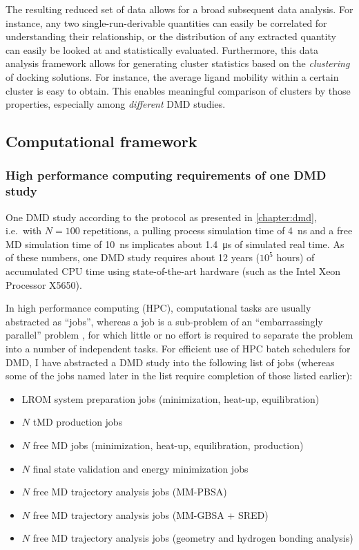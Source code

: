 The resulting reduced set of data allows for a broad subsequent data analysis.
For instance, any two single-run-derivable quantities can easily be correlated
for understanding their relationship, or the distribution of any extracted
quantity can easily be looked at and statistically evaluated. Furthermore, this
data analysis framework allows for generating cluster statistics based on the
\textit{clustering} of docking solutions. For instance, the average ligand
mobility within a certain cluster is easy to obtain. This enables meaningful
comparison of clusters by those properties, especially among \textit{different}
DMD studies.


\subsection{Computational framework}


\subsubsection{High performance computing requirements of one DMD study}

One DMD study according to the protocol as presented in \cref{chapter:dmd},
i.e.\ with $N = 100$ repetitions, a pulling process simulation time of
\SI{4}{\nano\second} and a free MD simulation time of \SI{10}{\nano\second}
implicates about \SI{1.4}{\micro\second} of simulated real time. As of these
numbers, one DMD study requires about 12 years ($10^5$ hours) of accumulated CPU
time using state-of-the-art hardware (such as the Intel Xeon Processor X5650).

In high performance computing (HPC), computational tasks are usually abstracted as
\enquote{jobs}, whereas a job is a sub-problem of an \enquote{embarrassingly
parallel} problem \cite{heath1986hypercube}, for which little or no effort is
required to separate the problem into a number of independent tasks. For
efficient use of HPC batch schedulers for DMD, I have abstracted a DMD study
into the following list of jobs (whereas some of the jobs named later in the
list require completion of those listed earlier):

\begin{itemize}
\item LROM system preparation jobs (minimization, heat-up, equilibration)
\item $N$ tMD production jobs
\item $N$ free MD jobs (minimization, heat-up, equilibration, production)
\item $N$ final state validation and energy minimization jobs
\item $N$ free MD trajectory analysis jobs (MM-PBSA)
\item $N$ free MD trajectory analysis jobs (MM-GBSA + SRED)
\item $N$ free MD trajectory analysis jobs (geometry and hydrogen bonding
analysis)
\end{itemize}

